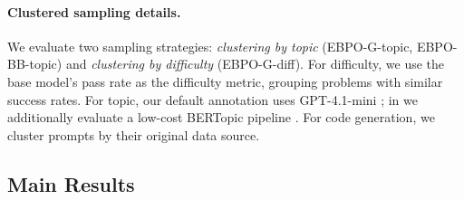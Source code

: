 \documentclass{article}
\theoremstyle{plain}
\theoremstyle{definition}
\theoremstyle{remark}
\newcommand{\oursG}{\textsc{EBPO-G}\xspace}
\newcommand{\oursBB}{\textsc{EBPO-BB}\xspace}
\begin{document}
\paragraph{Clustered sampling details.}
We evaluate two sampling strategies: \emph{clustering by topic} (\oursG-topic, \oursBB-topic) and \emph{clustering by difficulty} (\oursG-diff). For difficulty, we use the base model's pass rate as the difficulty metric, grouping problems with similar success rates. For topic, our default annotation uses GPT-4.1-mini \citep{achiam2023gpt}; in  we additionally evaluate a low-cost BERTopic pipeline \citep{grootendorst2022bertopic}. For code generation, we cluster prompts by their original data source.

\subsection{Main Results}
\label{sec:results}
\end{document}
